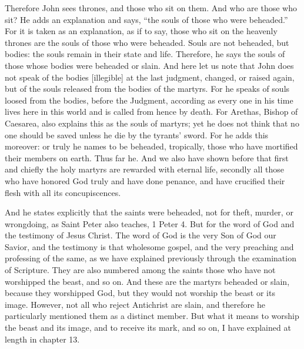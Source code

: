 Therefore John sees thrones, and those who sit on them. And who are those who sit? He adds an explanation and says, “the souls of those who were beheaded.” For it is taken as an explanation, as if to say, those who sit on the heavenly thrones are the souls of those who were beheaded. Souls are not beheaded, but bodies: the souls remain in their state and life. Therefore, he says the souls of those whose bodies were beheaded or slain. And here let us note that John does not speak of the bodies [illegible] at the last judgment, changed, or raised again, but of the souls released from the bodies of the martyrs. For he speaks of souls loosed from the bodies, before the Judgment, according as every one in his time lives here in this world and is called from hence by death. For Arethas, Bishop of Caesarea, also explains this as the souls of martyrs; yet he does not think that no one should be saved unless he die by the tyrants’ sword. For he adds this moreover: or truly he names to be beheaded, tropically, those who have mortified their members on earth. Thus far he. And we also have shown before that first and chiefly the holy martyrs are rewarded with eternal life, secondly all those who have honored God truly and have done penance, and have crucified their flesh with all its concupiscences.

And he states explicitly that the saints were beheaded, not for theft, murder, or wrongdoing, as Saint Peter also teaches, 1 Peter 4. But for the word of God and the testimony of Jesus Christ. The word of God is the very Son of God our Savior, and the testimony is that wholesome gospel, and the very preaching and professing of the same, as we have explained previously through the examination of Scripture. They are also numbered among the saints those who have not worshipped the beast, and so on. And these are the martyrs beheaded or slain, because they worshipped God, but they would not worship the beast or its image. However, not all who reject Antichrist are slain, and therefore he particularly mentioned them as a distinct member. But what it means to worship the beast and its image, and to receive its mark, and so on, I have explained at length in chapter 13.

